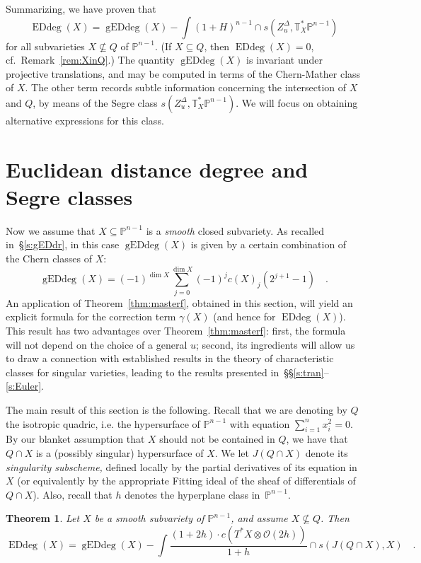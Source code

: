 \documentclass[11pt]{amsart}
\newtheorem{theorem}{Theorem}[section]
\numberwithin{equation}{section}
\newcommand{\Pbb}{{\mathbb{P}}}
\newcommand{\Tbb}{{\mathbb{T}}}
\newcommand{\cO}{{\mathscr O}}
\DeclareMathOperator{\Edd}{EDdeg}
\DeclareMathOperator{\gEdd}{gEDdeg}
\begin{document}
Summarizing, we have proven that
\begin{equation}\label{eq:genX}
\Edd(X) = \gEdd(X)-\int (1+H)^{n-1}\cap s(Z_u^\Delta, \Tbb^*_X\Pbb^{n-1})
\end{equation}
for all subvarieties $X\not\subseteq Q$ of $\Pbb^{n-1}$. (If $X\subseteq Q$, 
then $\Edd(X)=0$, cf.~Remark~\ref{rem:XinQ}.) The quantity $\gEdd(X)$
is invariant under projective translations, and may be computed in terms of
the Chern-Mather class of $X$. The other term records subtle information
concerning the intersection of $X$ and $Q$, by means of the Segre class 
$s(Z_u^\Delta, \Tbb^*_X\Pbb^{n-1})$. We will focus on obtaining alternative 
expressions for this class.


\section{Euclidean distance degree and Segre classes}\label{s:SH}

Now we assume that $X\subseteq \Pbb^{n-1}$ is a {\em smooth\/} closed subvariety.
As recalled in~\S\ref{s:gEDdr}, in this case $\gEdd(X)$ is given by a certain combination 
of the Chern classes of $X$:
\[
\gEdd(X)=(-1)^{\dim X} \sum_{j=0}^{\dim X} (-1)^j c(X)_j (2^{j+1}-1)\quad.
\]
An application of Theorem~\ref{thm:masterf},
obtained in this section, will yield an explicit formula for the correction term $\gamma(X)$
(and hence for $\Edd(X)$). This result has two advantages over Theorem~\ref{thm:masterf}: 
first, the formula will not depend on the choice of a general $u$; second, its ingredients
will allow us to draw a connection with established results in the theory of
characteristic classes for singular varieties, leading to the results presented 
in~\S\S\ref{s:tran}--\ref{s:Euler}.

The main result of this section is the following. Recall that we are denoting by $Q$ 
the isotropic quadric, i.e. the hypersurface of $\Pbb^{n-1}$ with equation 
$\sum_{i=1}^n x_i^2 = 0$. By our blanket assumption that $X$ should not be 
contained in $Q$, we have that $Q\cap X$ is a (possibly singular) hypersurface of 
$X$. We let $J(Q\cap X)$ denote its {\em singularity subscheme,\/} defined locally by 
the partial derivatives of its equation in $X$ (or equivalently by the appropriate Fitting ideal
of the sheaf of differentials of $Q\cap X$). Also, recall that $h$ denotes the hyperplane
class in~$\Pbb^{n-1}$.

\begin{theorem}\label{thm:segref}
Let $X$ be a smooth subvariety of $\Pbb^{n-1}$, and assume $X\not\subseteq Q$. Then 
\begin{equation}\label{eq:segref}
\Edd(X) = \gEdd(X) - \int \frac{(1+2h)\cdot c(T^*X\otimes \cO(2h))}{1+h} \cap s(J(Q\cap X), X)\quad.
\end{equation}
\end{theorem}
\end{document}

